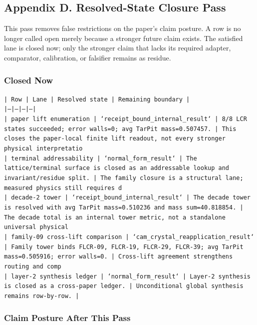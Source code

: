 \documentclass[11pt]{article}
\begin{document}
\subsection*{Appendix D. Resolved-State Closure Pass}

This pass removes false restrictions on the paper's claim posture. A row is no longer called open merely because a stronger future claim exists. The satisfied lane is closed now; only the stronger claim that lacks its required adapter, comparator, calibration, or falsifier remains as residue.

\subsubsection*{Closed Now}

\noindent\texttt{| Row | Lane | Resolved state | Remaining boundary |}\\
\noindent\texttt{|---|---|---|---|}\\
\noindent\texttt{| paper lift enumeration | `receipt\_bound\_internal\_result` | 8/8 LCR states succeeded; error walls=0; avg TarPit mass=0.507457. | This closes the paper-local finite lift readout, not every stronger physical interpretatio}\\
\noindent\texttt{| terminal addressability | `normal\_form\_result` | The lattice/terminal surface is closed as an addressable lookup and invariant/residue split. | The family closure is a structural lane; measured physics still requires d}\\
\noindent\texttt{| decade-2 tower | `receipt\_bound\_internal\_result` | The decade tower is resolved with avg TarPit mass=0.510236 and mass sum=40.818854. | The decade total is an internal tower metric, not a standalone universal physical }\\
\noindent\texttt{| family-09 cross-lift comparison | `cam\_crystal\_reapplication\_result` | Family tower binds FLCR-09, FLCR-19, FLCR-29, FLCR-39; avg TarPit mass=0.505916; error walls=0. | Cross-lift agreement strengthens routing and comp}\\
\noindent\texttt{| layer-2 synthesis ledger | `normal\_form\_result` | Layer-2 synthesis is closed as a cross-paper ledger. | Unconditional global synthesis remains row-by-row. |}\\

\subsubsection*{Claim Posture After This Pass}
\end{document}
